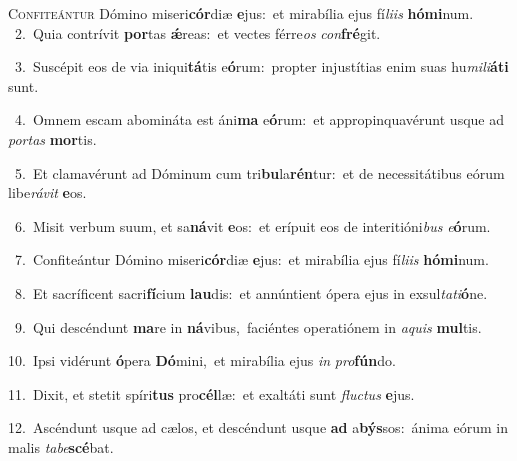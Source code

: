 \lettrine{\initial\textcolor{\initialcolor}{C}}{onfiteántur} Dómino miseri\-\textbf{cór}\-diæ \textbf{e}\-jus:~\star et mirabília ejus fí\-\textit{li}\-\textit{is} \textbf{hó}\-\textbf{mi}num.\\
{\numbfont\textcolor{\numbcolor}{~2.}}~Quia contrívit \textbf{por}\-tas \textbf{ǽ}\-reas:~\star et vectes férre\textit{os} \textit{con}\-\textbf{fré}git.\par
{\numbfont\textcolor{\numbcolor}{~3.}}~Suscépit eos de via iniqui\-\textbf{tá}\-tis e\-\textbf{ó}\-rum:~\star propter injustítias enim suas hu\-\textit{mi}\-\textit{li}\textbf{á}\textbf{ti} sunt.\par
{\numbfont\textcolor{\numbcolor}{~4.}}~Omnem escam abomináta est áni\textbf{ma} e\-\textbf{ó}\-rum:~\star et appropinquavérunt usque ad \textit{por}\-\textit{tas} \textbf{mor}\-tis.\par
{\numbfont\textcolor{\numbcolor}{~5.}}~Et clamavérunt ad Dóminum cum tri\-\textbf{bu}\-la\-\textbf{rén}\-tur:~\star et de necessitátibus eórum libe\-\textit{rá}\-\textit{vit} \textbf{e}\-os.\par
{\numbfont\textcolor{\numbcolor}{~6.}}~Misit verbum suum, et sa\-\textbf{ná}\-vit \textbf{e}\-os:~\star et erípuit eos de interitióni\textit{bus} \textit{e}\-\textbf{ó}rum.\par
{\numbfont\textcolor{\numbcolor}{~7.}}~Confiteántur Dómino miseri\-\textbf{cór}\-diæ \textbf{e}\-jus:~\star et mirabília ejus fí\-\textit{li}\-\textit{is} \textbf{hó}\-\textbf{mi}num.\par
{\numbfont\textcolor{\numbcolor}{~8.}}~Et sacríficent sacri\-\textbf{fí}\-cium \textbf{lau}\-dis:~\star et annúntient ópera ejus in exsul\-\textit{ta}\-\textit{ti}\textbf{ó}ne.\par
{\numbfont\textcolor{\numbcolor}{~9.}}~Qui descéndunt \textbf{ma}\-re in \textbf{ná}\-vibus,~\star faciéntes operatiónem in \textit{a}\-\textit{quis} \textbf{mul}\-tis.\par
{\numbfont\textcolor{\numbcolor}{10.}}~Ipsi vidérunt \textbf{ó}\-pera \textbf{Dó}\-mini,~\star et mirabília ejus \textit{in} \textit{pro}\-\textbf{fún}do.\par
{\numbfont\textcolor{\numbcolor}{11.}}~Dixit, et stetit spíri\textbf{tus} pro\-\textbf{cél}\-læ:~\star et exaltáti sunt \textit{fluc}\-\textit{tus} \textbf{e}\-jus.\par
{\numbfont\textcolor{\numbcolor}{12.}}~Ascéndunt usque ad cælos, et descéndunt usque \textbf{ad} a\-\textbf{býs}\-sos:~\star ánima eórum in malis \textit{ta}\-\textit{be}\textbf{scé}bat.\par
